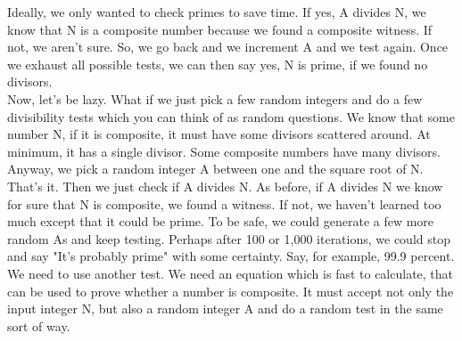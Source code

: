 \documentclass{report}
\begin{document}
Ideally, we only wanted to check primes to save time. If yes, A divides N, we know that N is a composite number because we found a composite witness. If not, we aren't sure. So, we go back and we increment A and we test again. Once we exhaust all possible tests, we can then say yes, N is prime, if we found no divisors.\\
Now, let's be lazy. What if we just pick a few random integers and do a few divisibility tests which you can think of as random questions. We know that some number N, if it is composite, it must have some divisors scattered around. At minimum, it has a single divisor. Some composite numbers have many divisors. Anyway, we pick a random integer A between one and the square root of N. That's it. Then we just check if A divides N. As before, if A divides N we know for sure that N is composite, we found a witness. If not, we haven't learned too much except that it could be prime. To be safe, we could generate a few more random As and keep testing. Perhaps after 100 or 1,000 iterations, we could stop and say "It's probably prime" with some certainty. Say, for example, 99.9 percent. \\
We need to use another test. We need an equation which is fast to calculate, that can be used to prove whether a number is composite. It must accept not only the input integer N, but also a random integer A and do a random test in the same sort of way.
\end{document}
